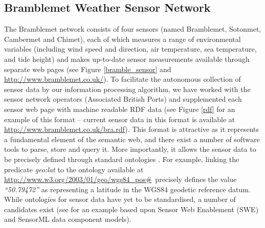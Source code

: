 \documentclass{acmsmall}
\begin{document}
\subsection{Bramblemet Weather Sensor Network}

\noindent The Bramblemet network consists of four sensors (named Bramblemet, Sotonmet, Cambermet and Chimet), each of which measures a range of environmental variables (including wind speed and direction, air temperature, sea temperature, and tide height) and makes up-to-date sensor measurements available through separate web pages (see Figure \ref{bramble_sensor} and \small\url{http://www.bramblemet.co.uk/}\normalsize). To facilitate the autonomous collection of sensor data by our information processing algorithm, we have worked with the sensor network operators (Associated British Ports) and supplemented each sensor web page with machine readable RDF data (see Figure \ref{rdf} for an example of this format -- current sensor data in this format is available at \small\url{http://www.bramblemet.co.uk/bra.rdf}\normalsize). This format is attractive as it represents a fundamental element of the semantic web, and there exist a number of software tools to parse, store and query it. More importantly, it allows the sensor data to be precisely defined through standard ontologies \cite{rdf}. For example, linking the predicate {\em geo:lat} to the ontology available at \small\url{http://www.w3.org/2003/01/geo/wgs84_pos#}\normalsize ~precisely defines the value {\em ``50.79472''} as representing a latitude in the WGS84 geodetic reference datum. While ontologies for sensor data have yet to be standardised, a number of candidates exist (see \cite{sensor_rdf} for an example based upon Sensor Web Enablement (SWE) and SensorML data component models).
\end{document}
